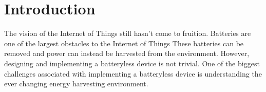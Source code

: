 \section{Introduction} %
\label{sec:introduction}

The vision of the Internet of Things still hasn't come to fruition.
Batteries are one of the largest obstacles to the Internet of Things \cite{intermittentAndAwesome}
These batteries can be removed and power can instead be harvested from the environment.
However, designing and implementing a batteryless device is not trivial.
One of the biggest challenges associated with implementing a batteryless device is understanding the ever changing energy harvesting environment.
